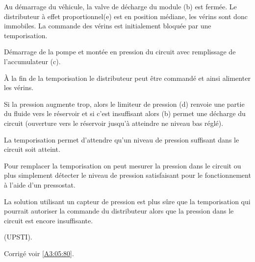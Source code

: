 \fi

Au démarrage du véhicule, la valve de décharge du module (b) est fermée. Le distributeur à effet proportionnel(e) est en position médiane, les vérins sont donc immobiles. La commande des vérins est initialement bloquée par une temporisation.

\ifprof
\begin{corrige}
Démarrage de la pompe et montée en pression du circuit avec remplissage de l’accumulateur (c).

À la fin de la temporisation le distributeur peut être commandé et ainsi alimenter les vérins.

Si la pression augmente trop, alors le limiteur de pression (d) renvoie une partie du fluide vers le
réservoir et si c’est insuffisant alors (b) permet une décharge du circuit (ouverture vers le réservoir
jusqu’à atteindre ne niveau bas réglé).

La temporisation permet d’attendre qu’un niveau de pression suffisant dans le circuit soit atteint.

Pour remplacer la temporisation on peut mesurer la pression dans le circuit ou plus simplement détecter
le niveau de pression satisfaisant pour le fonctionnement à l’aide d’un pressostat.

La solution utilisant un capteur de pression est plus sûre que la temporisation qui pourrait autoriser la
commande du distributeur alors que la pression dans le circuit est encore insuffisante.

(UPSTI). 
\end{corrige}
\else
\fi






\ifprof
\else
\begin{flushright}
\footnotesize{Corrigé  voir \ref{A3:05:80}.}
\end{flushright}%
\fi